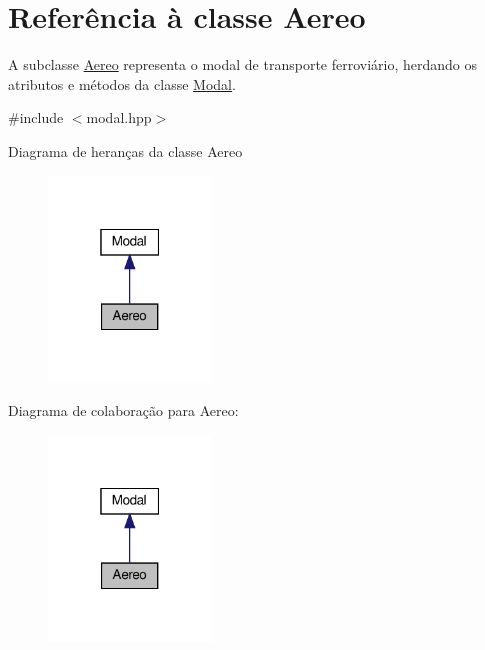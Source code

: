 \hypertarget{classAereo}{}\section{Referência à classe Aereo}
\label{classAereo}


A subclasse \hyperlink{classAereo}{Aereo} representa o modal de transporte ferroviário, herdando os atributos e métodos da classe \hyperlink{classModal}{Modal}.  




{\ttfamily \#include $<$modal.\+hpp$>$}



Diagrama de heranças da classe Aereo
\nopagebreak
\begin{figure}[H]
\begin{center}
\leavevmode
\includegraphics[width=123pt]{classAereo__inherit__graph}
\end{center}
\end{figure}


Diagrama de colaboração para Aereo\+:
\nopagebreak
\begin{figure}[H]
\begin{center}
\leavevmode
\includegraphics[width=123pt]{classAereo__coll__graph}
\end{center}
\end{figure}
